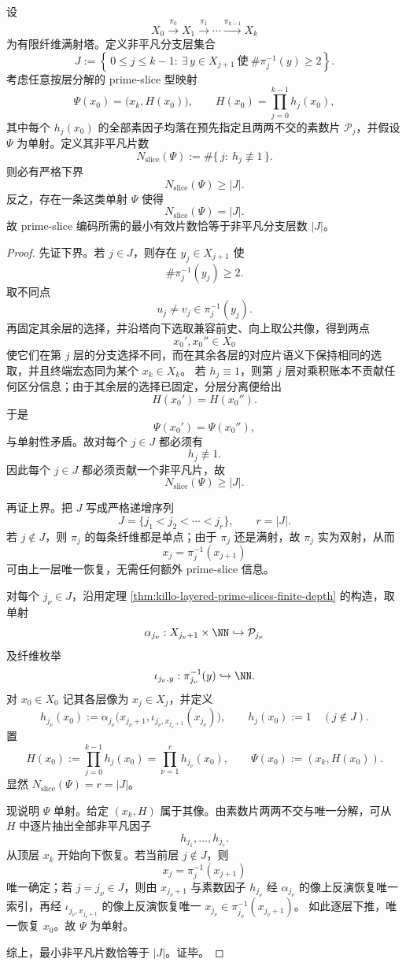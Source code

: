 \begin{theorem}\label{thm:xi-prime-slice-nontrivial-layer-exact-minimality}
设
\[
X_0\xrightarrow{\pi_0}X_1\xrightarrow{\pi_1}\cdots\xrightarrow{\pi_{k-1}}X_k
\]
为有限纤维满射塔。定义非平凡分支层集合
\[
J:=
\left\{
\,0\le j\le k-1:\ \exists\,y\in X_{j+1}\ \text{使}\ \#\pi_j^{-1}(y)\ge 2
\right\}.
\]
考虑任意按层分解的 prime-slice 型映射
\[
\Psi(x_0)=\bigl(x_k,H(x_0)\bigr),
\qquad
H(x_0)=\prod_{j=0}^{k-1}h_j(x_0),
\]
其中每个 \(h_j(x_0)\) 的全部素因子均落在预先指定且两两不交的素数片
\(\mathcal P_j\)，并假设 \(\Psi\) 为单射。定义其非平凡片数
\[
N_{\mathrm{slice}}(\Psi):=\#\{\,j:\ h_j\not\equiv 1\,\}.
\]
则必有严格下界
\[
N_{\mathrm{slice}}(\Psi)\ge |J|.
\]
反之，存在一条这类单射 \(\Psi\) 使得
\[
N_{\mathrm{slice}}(\Psi)=|J|.
\]
故 prime-slice 编码所需的最小有效片数恰等于非平凡分支层数 \(|J|\)。
\end{theorem}
\begin{proof}
先证下界。若 \(j\in J\)，则存在 \(y_j\in X_{j+1}\) 使
\[
\#\pi_j^{-1}(y_j)\ge 2.
\]
取不同点
\[
u_j\neq v_j\in \pi_j^{-1}(y_j).
\]
再固定其余层的选择，并沿塔向下选取兼容前史、向上取公共像，得到两点
\[
x_0',x_0''\in X_0
\]
使它们在第 \(j\) 层的分支选择不同，而在其余各层的对应片语义下保持相同的选取，并且终端宏态同为某个 \(x_k\in X_k\)。
若 \(h_j\equiv 1\)，则第 \(j\) 层对乘积账本不贡献任何区分信息；由于其余层的选择已固定，分层分离便给出
\[
H(x_0')=H(x_0'').
\]
于是
\[
\Psi(x_0')=\Psi(x_0''),
\]
与单射性矛盾。故对每个 \(j\in J\) 都必须有
\[
h_j\not\equiv 1.
\]
因此每个 \(j\in J\) 都必须贡献一个非平凡片，故
\[
N_{\mathrm{slice}}(\Psi)\ge |J|.
\]

再证上界。把 \(J\) 写成严格递增序列
\[
J=\{j_1<j_2<\cdots<j_r\},
\qquad r=|J|.
\]
若 \(j\notin J\)，则 \(\pi_j\) 的每条纤维都是单点；由于 \(\pi_j\) 还是满射，故 \(\pi_j\) 实为双射，从而
\[
x_j=\pi_j^{-1}(x_{j+1})
\]
可由上一层唯一恢复，无需任何额外 prime-slice 信息。

对每个 \(j_\nu\in J\)，沿用定理 \ref{thm:killo-layered-prime-slices-finite-depth} 的构造，取单射
\[
\alpha_{j_\nu}:X_{j_\nu+1}\times\NN\hookrightarrow \mathcal P_{j_\nu}
\]
及纤维枚举
\[
\iota_{j_\nu,y}:\pi_{j_\nu}^{-1}(y)\hookrightarrow \NN.
\]
对 \(x_0\in X_0\) 记其各层像为 \(x_j\in X_j\)，并定义
\[
h_{j_\nu}(x_0):=
\alpha_{j_\nu}\!\bigl(x_{j_\nu+1},\iota_{j_\nu,x_{j_\nu+1}}(x_{j_\nu})\bigr),
\qquad
h_j(x_0):=1\quad(j\notin J).
\]
置
\[
H(x_0):=\prod_{j=0}^{k-1}h_j(x_0)
=
\prod_{\nu=1}^{r}h_{j_\nu}(x_0),
\qquad
\Psi(x_0):=(x_k,H(x_0)).
\]
显然 \(N_{\mathrm{slice}}(\Psi)=r=|J|\)。

现说明 \(\Psi\) 单射。给定 \((x_k,H)\) 属于其像。由素数片两两不交与唯一分解，可从 \(H\) 中逐片抽出全部非平凡因子
\[
h_{j_1},\dots,h_{j_r}.
\]
从顶层 \(x_k\) 开始向下恢复。若当前层 \(j\notin J\)，则
\[
x_j=\pi_j^{-1}(x_{j+1})
\]
唯一确定；若 \(j=j_\nu\in J\)，则由 \(x_{j_\nu+1}\) 与素数因子 \(h_{j_\nu}\) 经
\(\alpha_{j_\nu}\) 的像上反演恢复唯一索引，再经
\(\iota_{j_\nu,x_{j_\nu+1}}\) 的像上反演恢复唯一 \(x_{j_\nu}\in\pi_{j_\nu}^{-1}(x_{j_\nu+1})\)。
如此逐层下推，唯一恢复 \(x_0\)。故 \(\Psi\) 为单射。

综上，最小非平凡片数恰等于 \(|J|\)。证毕。
\end{proof}

